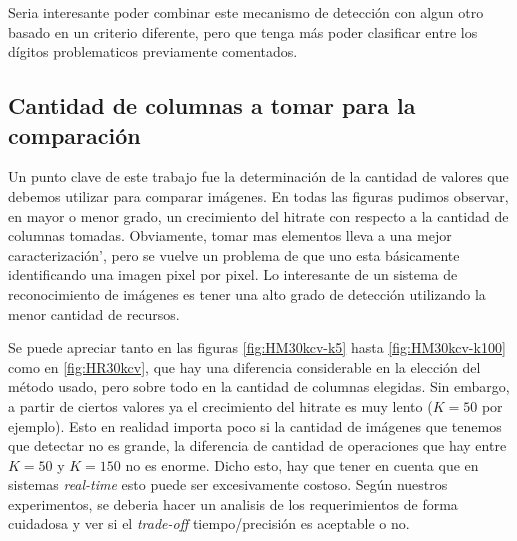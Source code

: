 Seria interesante poder combinar este mecanismo de detecci\'on con algun otro basado en un
criterio diferente, pero que tenga m\'as poder clasificar entre los d\'igitos problematicos
previamente comentados.


\subsection{Cantidad de columnas a tomar para la comparaci\'on}
Un punto clave de este trabajo fue la determinaci\'on de la cantidad de valores que debemos
utilizar para comparar im\'agenes. En todas las figuras pudimos observar, en mayor o menor
grado, un crecimiento del hitrate con respecto a la cantidad de columnas tomadas.
Obviamente, tomar mas elementos lleva a una mejor caracterizaci\'on', pero se vuelve un problema
de que uno esta b\'asicamente identificando una imagen pixel por pixel. Lo interesante de un
sistema de reconocimiento de im\'agenes es tener una alto grado de detecci\'on utilizando la menor
cantidad de recursos.


Se puede apreciar tanto en las figuras \ref{fig:HM30kcv-k5} hasta \ref{fig:HM30kcv-k100} como
en \ref{fig:HR30kcv}, que hay una diferencia considerable en la elecci\'on del m\'etodo usado,
pero sobre todo en la cantidad de columnas elegidas. Sin embargo, a partir de ciertos valores
ya el crecimiento del hitrate es muy lento ($K=50$ por ejemplo). Esto en realidad importa poco
si la cantidad de im\'agenes que tenemos que detectar no es grande, la diferencia de cantidad
de operaciones que hay entre $K=50$ y $K=150$ no es enorme. Dicho esto, hay que tener en cuenta que
en sistemas \textit{real-time} esto puede ser excesivamente costoso. Seg\'un nuestros experimentos,
se deberia hacer un analisis de los requerimientos de forma cuidadosa y ver si el \textit{trade-off} tiempo/precisi\'on
es aceptable o no.
